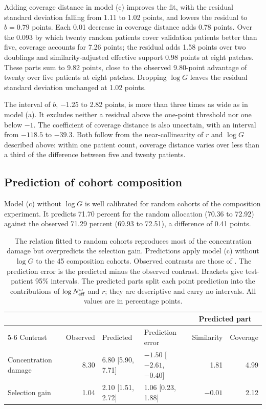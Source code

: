 \noindent Adding coverage distance in model (c) improves the fit, with the residual standard deviation falling from 1.11 to 1.02 points, and lowers the residual to $b=0.79$ points. Each 0.01 decrease in coverage distance adds 0.78 points. Over the 0.093 by which twenty random patients cover validation patients better than five, coverage accounts for 7.26 points; the residual adds 1.58 points over two doublings and similarity-adjusted effective support 0.98 points at eight patches. These parts sum to 9.82 points, close to the observed 9.80-point advantage of twenty over five patients at eight patches. Dropping $\log G$ leaves the residual standard deviation unchanged at 1.02 points.

The interval of $b$, $-1.25$ to 2.82 points, is more than three times as wide as in model (a). It excludes neither a residual above the one-point threshold nor one below $-1$. The coefficient of coverage distance is also uncertain, with an interval from $-118.5$ to $-39.3$. Both follow from the near-collinearity of $r$ and $\log G$ described above: within one patient count, coverage distance varies over less than a third of the difference between five and twenty patients.

\subsection{Prediction of cohort composition}
\label{sec:prediction-results}
Model (c) without $\log G$ is well calibrated for random cohorts of the composition experiment. It predicts 71.70 percent for the random allocation (70.36 to 72.92) against the observed 71.29 percent (69.93 to 72.51), a difference of 0.41 points.

\begin{table}[htbp]
\centering
\small
\renewcommand{\arraystretch}{1.15}
\begin{tabular}{@{}lrllrr@{}}
\toprule
 & & & & \multicolumn{2}{c}{Predicted part} \\
\cmidrule(l){5-6}
Contrast & Observed & Predicted & Prediction error & Similarity & Coverage \\
\midrule
Concentration damage & 8.30 & 6.80 [5.90, 7.71] & $-1.50$ [$-2.61$, $-0.40$] & 1.81 & 4.99 \\
Selection gain & 1.04 & 2.10 [1.51, 2.72] & 1.06 [0.23, 1.88] & $-0.01$ & 2.12 \\
\bottomrule
\end{tabular}
\caption{The relation fitted to random cohorts reproduces most of the concentration damage but overpredicts the selection gain. Predictions apply model (c) without $\log G$ to the 45 composition cohorts. Observed contrasts are those of \citet{queisler2026cohortComposition}. The prediction error is the predicted minus the observed contrast. Brackets give test-patient 95\% intervals. The predicted parts split each point prediction into the contributions of $\log N_{\mathrm{eff}}^{\omega}$ and $r$; they are descriptive and carry no intervals. All values are in percentage points.}
\label{tab:prediction}
\end{table}

